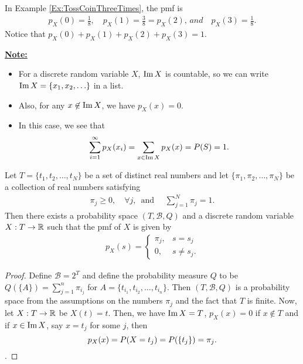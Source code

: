 \begin{example}
In Example \ref{Ex:TossCoinThreeTimes}, the pmf is
    \begin{align*}
    p_X (0) = \frac{1}{8} , \quad p_X (1) = \frac{3}{8} = p_X (2) , \, and \quad p_X (3) = \frac{1}{8} .
    \end{align*}
Notice that $p_X (0) + p_X (1) + p_X (2) + p_X (3) = 1$.
\end{example}

\underline{\textbf{Note:}}
    \begin{itemize}
    \item For a discrete random variable $X$, $\operatorname{Im} X$ is countable, so we can write $\operatorname{Im} X = \{ x_1 , x_2 , \ldots \}$ in a list. 
    \item Also, for any $x \not \in \operatorname{Im} X$, we have $p_X(x) = 0$. 
    \item In this case, we see that
        \begin{align*}
        \sum_{i = 1}^\infty p_X (x_i) = \sum_{x \in \operatorname{Im} X} p_X (x) = P (S) = 1 .
        \end{align*} 
    \end{itemize}

\begin{theorem}
Let $T = \{ t_1, t_2, \ldots , t_N \}$ be a set of distinct real numbers and let $\{ \pi_1 , \pi_2 , \ldots , \pi_N \}$ be a collection of real numbers satisfying
    \begin{align*}
    \pi_j \geq 0, \quad \forall j , \, \text{ and } \quad \sum_{j = 1}^N \pi_j = 1 .
    \end{align*} 
Then there exists a probability space $(T, \mathcal{B}, Q)$ and a discrete random variable $X : T \rightarrow \mathbb{R}$ such that the pmf of $X$ is given by
    \begin{align*}
    p_X (s) = \left\{ \begin{matrix}
    \pi_j,  & s = s_j \\
    0, & s \neq s_j .
    \end{matrix} \right.
    \end{align*} 
\end{theorem}
\begin{proof}
Define $\mathcal{B} = 2^T$ and define the probability measure $Q$ to be $Q (\{ A \}) = \sum_{j = 1}^n \pi_{i_j}$ for $A = \{ t_{i_1} , t_{i_2}, \ldots , t_{i_n}\}$. Then $(T, \mathcal{B} , Q )$ is a probability space from the assumptions on the numbers $\pi_j$ and the fact that $T$ is finite. Now, let $X : T \rightarrow \mathbb{R}$ be $X (t) = t$. Then, we have $\operatorname{Im} X = T$, $p_X(x) = 0$ if $x \not \in T$ and if $x \in \operatorname{Im} X$, say $x = t_j$ for some $j$, then
    \begin{equation*}
    p_X (x) = P (X = t_j) = P (\{ t_j \}) = \pi_j .\qedhere
    \end{equation*} .
\end{proof}

